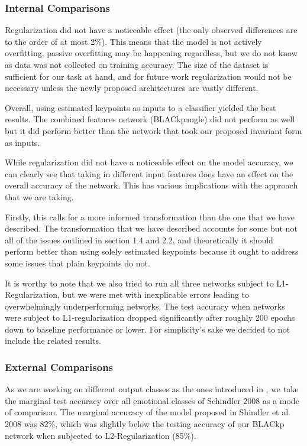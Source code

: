 \documentclass{article}
\begin{document}
\subsubsection{Internal Comparisons}

Regularization did not have a noticeable effect (the only observed differences are to the order of at most 2\%). This means that the model is not actively overfitting, passive overfitting may be happening regardless, but we do not know as data was not collected on training accuracy. The size of the dataset is sufficient for our task at hand, and for future work regularization would not be necessary unless the newly proposed architectures are vastly different.

Overall, using estimated keypoints as inputs to a classifier yielded the best results. The combined features network (BLACkpangle) did not perform as well but it did perform better than the network that took our proposed invariant form as inputs.

While regularization did not have a noticeable effect on the model accuracy, we can clearly see that taking in different input features does have an effect on the overall accuracy of the network. This has various implications with the approach that we are taking.

Firstly, this calls for a more informed transformation than the one that we have described. The transformation that we have described accounts for some but not all of the issues outlined in section 1.4 and 2.2, and theoretically it should perform better than using solely estimated keypoints because it ought to address some issues that plain keypoints do not.

It is worthy to note that we also tried to run all three networks subject to L1-Regularization, but we were met with inexplicable errors leading to overwhelmingly underperforming networks. The test accuracy when networks were subject to L1-regularization dropped significantly after roughly 200 epochs down to baseline performance or lower. For simplicity's sake we decided to not include the related results.

\subsubsection{External Comparisons}

As we are working on different output classes as the ones introduced in \citep{schindler2008recognizing}, we take the marginal test accuracy over all emotional classes of Schindler 2008 as a mode of comparison. The marginal accuracy of the model proposed in Shindler et al. 2008 was 82\%, which was slightly below the testing accuracy of our BLACkp network when subjected to L2-Regularization (85\%).
\end{document}
